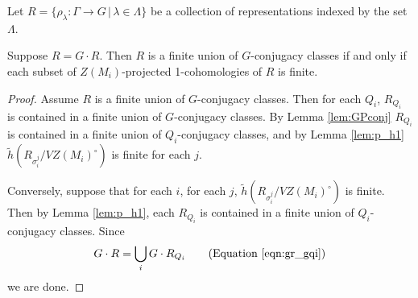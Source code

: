 \begin{theorem}
  Let $R=\{\rho_\lambda:\Gamma\rightarrow G\,|\,\lambda \in \Lambda\}$ be a collection of representations indexed by the set $\Lambda$. 
  
  Suppose $R = G \cdot R$. Then $R$ is a finite union of $G$-conjugacy classes if and only if each subset of $Z(M_i)$-projected 1-cohomologies of $R$ is finite.
  \label{thm:g_h1}
\end{theorem}
\begin{proof}
  Assume $R$ is a finite union of $G$-conjugacy classes. Then for each $Q_i$, $R_{Q_i}$ is contained in a finite union of $G$-conjugacy classes. By Lemma \ref{lem:GPconj} $R_{Q_i}$ is contained in a finite union of $Q_i$-conjugacy classes, and by Lemma \ref{lem:p_h1} $\tilde{h}(R_{\sigma_i^j}/VZ(M_i)^\circ)$ is finite for each $j$.

  Conversely, suppose that for each $i$, for each $j$, $\tilde{h}(R_{\sigma_i^j}/VZ(M_i)^\circ)$ is finite. Then by Lemma \ref{lem:p_h1}, each $R_{Q_i}$ is contained in a finite union of $Q_i$-conjugacy classes. Since
  \begin{displaymath}
    G \cdot R = \bigcup_i G \cdot R_{Q_i} \qquad (\textrm{Equation }\ref{eqn:gr_gqi})
  \end{displaymath}
  we are done.
\end{proof}

